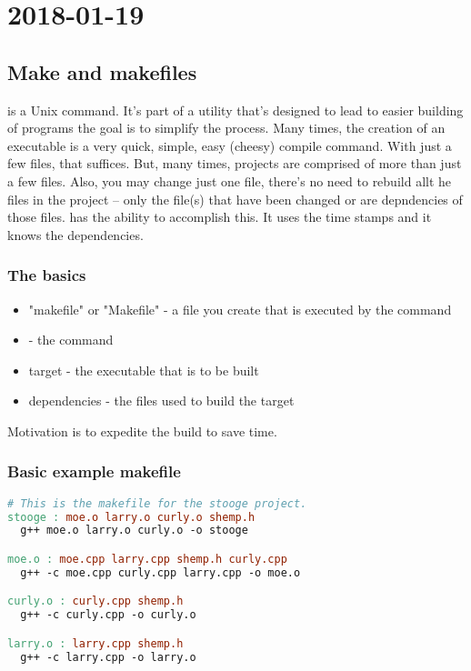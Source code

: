 \section{2018-01-19}


\subsection{Make and makefiles}

 is a Unix command. It's part of a utility that's designed to lead to easier building of programs the goal is to simplify the process. Many times, the creation of an executable is a very quick, simple, easy (cheesy) compile command. With just a few files, that suffices. But, many times, projects are comprised  of more than just a few files. Also, you may change just one file, there's no need to rebuild allt he files in the project -- only the file(s) that have been changed or are depndencies of those files.  has the ability to accomplish this. It uses the time stamps and it knows the dependencies.

\subsubsection{The basics}

\begin{itemize}
  \item "makefile" or "Makefile" - a file you create that is executed by the command 
  \item {} - the command
  \item target - the executable that is to be built
  \item dependencies - the files used to build the target
\end{itemize}

Motivation is to expedite the build to save time.

\subsubsection{Basic example makefile}

\begin{lstlisting}[language=make]
# This is the makefile for the stooge project.
stooge : moe.o larry.o curly.o shemp.h 
  g++ moe.o larry.o curly.o -o stooge

moe.o : moe.cpp larry.cpp shemp.h curly.cpp 
  g++ -c moe.cpp curly.cpp larry.cpp -o moe.o 

curly.o : curly.cpp shemp.h
  g++ -c curly.cpp -o curly.o

larry.o : larry.cpp shemp.h
  g++ -c larry.cpp -o larry.o
\end{lstlisting}

